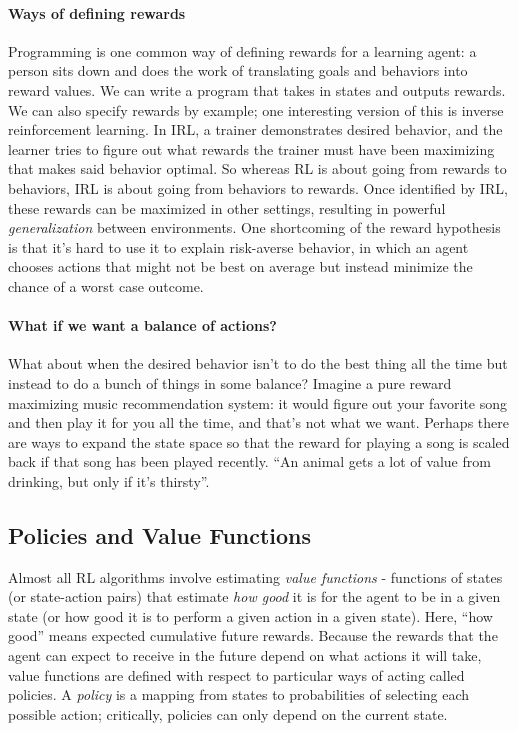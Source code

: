 \documentclass[12pt]{article}
\begin{document}
\paragraph{Ways of defining rewards}
Programming is one common way of defining rewards for a learning agent: a person sits down and does the work of translating goals and behaviors into reward values. We can write a program that takes in states and outputs rewards. We can also specify rewards by example; one interesting version of this is inverse reinforcement learning. In IRL, a trainer demonstrates desired behavior, and the learner tries to figure out what rewards the trainer must have been maximizing that makes said behavior optimal. So whereas RL is about going from rewards to behaviors, IRL is about going from behaviors to rewards. Once identified by IRL, these rewards can be maximized in other settings, resulting in powerful \emph{generalization} between environments. One shortcoming of the reward hypothesis is that it's hard to use it to explain risk-averse behavior, in which an agent chooses actions that might not be best on average but instead minimize the chance of a worst case outcome.

\paragraph{What if we want a balance of actions?}
What about when the desired behavior isn't to do the best thing all the time but instead to do a bunch of things in some balance? Imagine a pure reward maximizing music recommendation system: it would figure out your favorite song and then play it for you all the time, and that's not what we want. Perhaps there are ways to expand the state space so that the reward for playing a song is scaled back if that song has been played recently. ``An animal gets a lot of value from drinking, but only if it's thirsty''.

\subsection{Policies and Value Functions} Almost all RL algorithms involve estimating \emph{value functions} - functions of states (or state-action pairs) that estimate \emph{how good} it is for the agent to be in a given state (or how good it is to perform a given action in a given state). Here, ``how good'' means expected cumulative future rewards. Because the rewards that the agent can expect to receive in the future depend on what actions it will take, value functions are defined with respect to particular ways of acting called policies.
A \emph{policy} is a mapping from states to probabilities of selecting each possible action; critically, policies can only depend on the current state.
\end{document}
